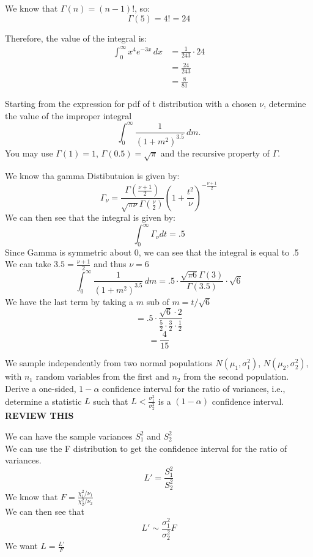 \documentclass[answers,12pt,addpoints]{exam}
\begin{document}
\begin{questions}
\begin{solution}
        We know that $\Gamma(n) = (n-1)!$, so:
        $$ \Gamma(5) = 4! = 24 $$

        Therefore, the value of the integral is:
        \begin{align*}
            \int_{0}^{\infty} x^4 e^{-3x} \, dx &= \frac{1}{243} \cdot 24 \\
            &= \frac{24}{243} \\
            &= \frac{8}{81}
        \end{align*}
    \end{solution}

    \question Starting from the expression for pdf of t distribution with a chosen $\nu$, determine the value of the improper integral 
    $$ \int_{0}^{\infty} \frac{1}{(1+m^2)^{3.5}} \, dm. $$ 
    You may use $\Gamma(1) = 1$, $\Gamma(0.5) = \sqrt{\pi}$ and the recursive property of $\Gamma$.

    \begin{solution}
        We know tha gamma Distibutuion is given by:
        $$ \Gamma_\nu = \frac{\Gamma(\frac{\nu +1}{2})}{\sqrt{\pi \nu} \Gamma(\frac{\nu}{2})}(1+ \frac{t^2}{\nu})^{-\frac{\nu +1}{2}}$$ 
        We can then see that the integral is given by:
        $$ \int_{0}^{\infty} \Gamma_\nu dt = .5$$ 
        Since Gamma is symmetric about 0, we can see that the integral is equal to .5
        We can take $3.5 = \frac{\nu+1}{2}$ and thus $\nu = 6$
        $$ \int_{0}^{\infty} \frac{1}{(1+m^2)^{3.5}} \, dm = .5 \cdot \frac{\sqrt{\pi 6} \Gamma(3)}{\Gamma(3.5)} \cdot \sqrt{6}$$
        We have the last term by taking a $m$ sub of $m = t/\sqrt{6}$\\
        $$ = .5 \cdot \frac{\sqrt{6} \cdot 2}{\frac{5}{2} \cdot \frac{3}{2} \cdot \frac{1}{2}}$$
        $$ = \frac{4}{15}$$ 
    \end{solution}

    \question We sample independently from two normal populations $N(\mu_1, \sigma_1^2)$, $N(\mu_2, \sigma_2^2)$, with $n_1$ random variables from the first and $n_2$ from the second population. Derive a one-sided, $1 - \alpha$ confidence interval for the ratio of variances, i.e., determine a statistic $L$ such that $L < \frac{\sigma_1^2}{\sigma_2^2}$ is a $(1 - \alpha)$ confidence interval.
    \textbf{REVIEW THIS}

    \begin{solution}
        We can have the sample variances $S_1^2$ and $S_2^2$\\
        We can use the F distribution to get the confidence interval for the ratio of variances.\\
        $$L' = \frac{S_1^2}{S_2^2} $$
        We know that $F = \frac{\chi_1^2/\nu_1}{\chi_2^2/\nu_2}$\\
        We can then see that
        $$ L' \sim \frac{\sigma_1^2}{\sigma_2^2} F$$
        We want $L = \frac{L'}{F}$\\

    \end{solution}
    
    

\end{questions}
\end{document}
